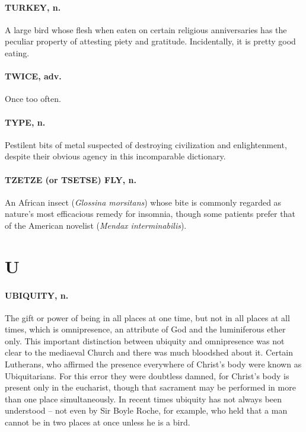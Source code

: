 \documentclass[11pt]{article}
\begin{document}
\paragraph{TURKEY, n.}  A large bird whose flesh when eaten on certain religious
anniversaries has the peculiar property of attesting piety and
gratitude.  Incidentally, it is pretty good eating.

\paragraph{TWICE, adv.}  Once too often.

\paragraph{TYPE, n.}  Pestilent bits of metal suspected of destroying
civilization and enlightenment, despite their obvious agency in this
incomparable dictionary.

\paragraph{TZETZE (or TSETSE) FLY, n.}  An African insect ({\em Glossina morsitans})
whose bite is commonly regarded as nature's most efficacious remedy
for insomnia, though some patients prefer that of the American
novelist ({\em Mendax interminabilis}).



\section*{U}



\paragraph{UBIQUITY, n.}  The gift or power of being in all places at one time,
but not in all places at all times, which is omnipresence, an
attribute of God and the luminiferous ether only.  This important
distinction between ubiquity and omnipresence was not clear to the
mediaeval Church and there was much bloodshed about it.  Certain
Lutherans, who affirmed the presence everywhere of Christ's body were
known as Ubiquitarians.  For this error they were doubtless damned,
for Christ's body is present only in the eucharist, though that
sacrament may be performed in more than one place simultaneously.  In
recent times ubiquity has not always been understood -- not even by
Sir Boyle Roche, for example, who held that a man cannot be in two
places at once unless he is a bird.
\end{document}

